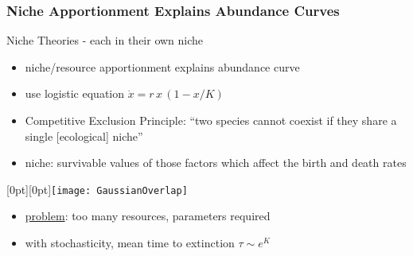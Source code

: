 \documentclass[dvipsnames]{beamer}
\begin{document}
\newcommand{\lenitem}[2][.5\linewidth]{\parbox[t]{#1}{\strut #2\strut}}
\begin{frame}
\frametitle{Niche Apportionment Explains Abundance Curves}
\Large{Niche Theories - each in their own niche}\normalsize{}
\begin{itemize}
	\item niche/resource apportionment explains abundance curve
	\item use logistic equation  $\dot{x} = r \, x \, \left(1-x/K\right)$
	\pause
	\item Competitive Exclusion Principle: ``two species cannot coexist if they share a single [ecological] niche''%
	\item \lenitem{niche: survivable values of those factors which affect the birth and death rates}
\end{itemize}
\vspace*{-3\baselineskip}
\mbox{}\hfill\raisebox{-\height}[0pt][0pt]{\texttt{[image: GaussianOverlap]}}
\vspace*{4.5\baselineskip}
\begin{itemize}
	\pause
	\item \underline{problem}: too many resources, parameters required
	\pause
	\item with stochasticity, mean time to extinction $\tau \sim e^K$ %
\end{itemize}
\end{frame}
\end{document}
